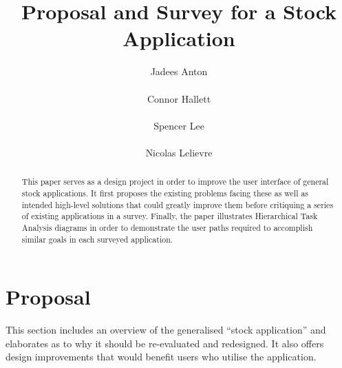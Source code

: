 \documentclass{sigchi}
\begin{document}
\title{Proposal and Survey for a Stock Application}
\author{
	\alignauthor Jadees Anton\\
		\\
	\alignauthor Connor Hallett\\
		\\
	\alignauthor Spencer Lee\\
		\\
	\alignauthor Nicolas Lelievre\\
}

\maketitle

\begin{abstract}
This paper serves as a design project in order to improve the user interface of general stock applications. It first proposes the existing problems facing these as well as intended high-level solutions that could greatly improve them before critiquing a series of existing applications in a survey. Finally, the paper illustrates Hierarchical Task Analysis diagrams in order to demonstrate the user paths required to accomplish similar goals in each surveyed application.
\end{abstract}

\section{Proposal}
This section includes an overview of the generalised ``stock application'' and elaborates as to why it should be re-evaluated and redesigned. It also offers design improvements that would benefit users who utilise the application.
\end{document}
